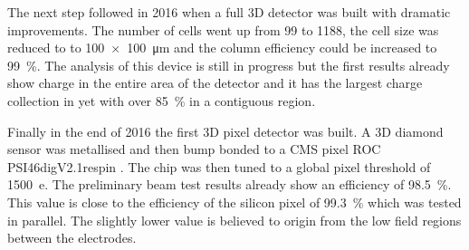 The next step followed in 2016 when a full 3D detector was built with dramatic improvements. The number of cells went up from 99 to 1188, the cell size was reduced to to \SI{100x100}{\micro\meter} and the column efficiency could be increased to \SI{99}{\%}. The analysis of this device is still in progress but the first results already show charge in the entire area of the detector and it has the largest charge collection in \pcvd yet with over \SI{85}{\%} in a contiguous region.\par
Finally in the end of 2016 the first \pcvd 3D pixel detector was built. A 3D diamond sensor was metallised and then bump bonded to a CMS pixel \ac{ROC} PSI46digV2.1respin \cite{kornmayer}. The chip was then tuned to a global pixel threshold of \SI{1500}{e}. The preliminary beam test results already show an efficiency of \SI{98.5}{\%}. This value is close to the efficiency of the silicon pixel of \SI{99.3}{\%} which was tested in parallel. The slightly lower value is believed to origin from the low field regions between the electrodes.